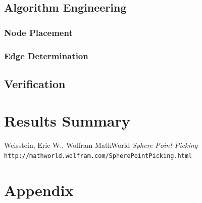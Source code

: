 \documentclass{article}
\begin{document}

    \subsection{Algorithm Engineering}

        \subsubsection{Node Placement}

        \subsubsection{Edge Determination}

    \subsection{Verification}


\section{Results Summary}

\newpage

\begin{thebibliography}{10}
    Weisstein, Eric W., Wolfram MathWorld
    \textit{Sphere Point Picking}
    \texttt{http://mathworld.wolfram.com/SpherePointPicking.html}

\end{thebibliography}

\newpage

\section{Appendix}
\end{document}
